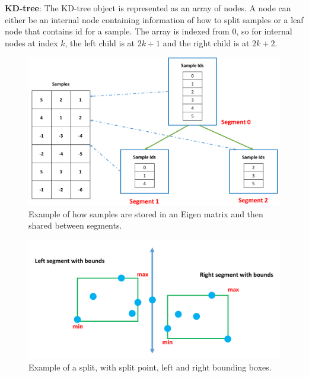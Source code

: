 \documentclass[11pt]{amsart}
\begin{document}
\begin{list}{}{\leftmargin= 1.4cm}
\item \textbf{KD-tree}: The KD-tree object is represented as an array of nodes. A node can either be an  internal node containing information of how to split samples or a leaf node that contains id for a sample. The array is indexed from 0, so for internal nodes at index $k$, the left child is at $2k + 1$ and the right child is at $2k + 2$.

\end{list}

\begin{figure}[t!]
\centering
\includegraphics[width=\linewidth]{images/segment}
\caption{Example of how samples are stored in an Eigen matrix and then shared between segments.}
\label{fig:segment}
\end{figure}

\begin{figure}[t!]
\centering
\includegraphics[width=\linewidth]{images/bounding_box}
\caption{Example of a split, with split point, left and right bounding boxes.}
\label{fig:bounding_box}
\end{figure}
\end{document}
